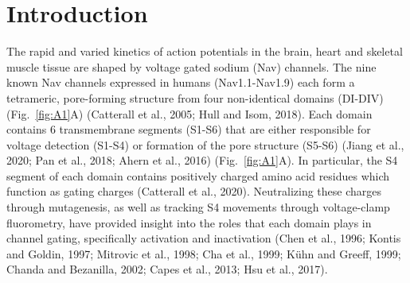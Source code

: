 \section{Introduction}
The rapid and varied kinetics of action potentials in the brain, heart and skeletal muscle tissue are shaped by voltage gated sodium (Nav) channels. The nine known Nav channels expressed in humans (Nav1.1-Nav1.9) each form a tetrameric, pore-forming structure from four non-identical domains (DI-DIV) (Fig.~\ref{fig:A1}A) (Catterall et al., 2005; Hull and Isom, 2018). Each domain contains 6 transmembrane segments (S1-S6) that are either responsible for voltage detection (S1-S4) or formation of the pore structure (S5-S6) (Jiang et al., 2020; Pan et al., 2018; Ahern et al., 2016) (Fig.~\ref{fig:A1}A). In particular, the S4 segment of each domain contains positively charged amino acid residues which function as gating charges (Catterall et al., 2020). Neutralizing these charges through mutagenesis, as well as tracking S4 movements through voltage-clamp fluorometry, have provided insight into the roles that each domain plays in channel gating, specifically activation and inactivation (Chen et al., 1996; Kontis and Goldin, 1997; Mitrovic et al., 1998; Cha et al., 1999; Kühn and Greeff, 1999; Chanda and Bezanilla, 2002; Capes et al., 2013; Hsu et al., 2017).

